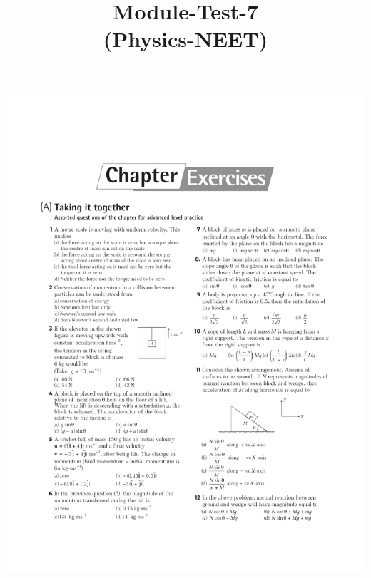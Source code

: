 \documentclass{article}
\title{Module-Test-7\\(Physics-NEET)}
\begin{document}
\maketitle


\includegraphics[trim={2.5cm 0 2cm 0},clip, width=170 mm]{p1-12}
\linebreak
\end{document}
